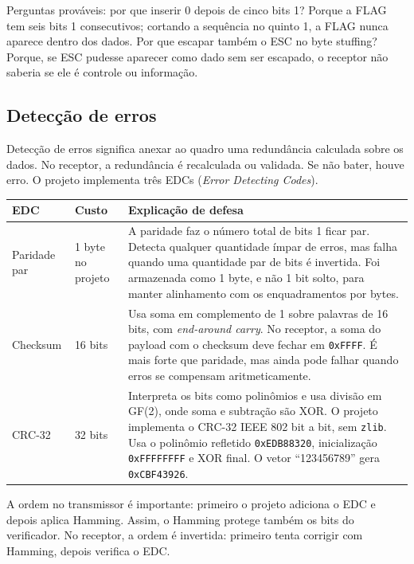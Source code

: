 \documentclass[10pt,a4paper]{article}
\newcommand{\codigo}[1]{\texttt{#1}}
\begin{document}
Perguntas prováveis: por que inserir 0 depois de cinco bits 1? Porque a FLAG tem seis bits 1 consecutivos; cortando a sequência no quinto 1, a FLAG nunca aparece dentro dos dados. Por que escapar também o ESC no byte stuffing? Porque, se ESC pudesse aparecer como dado sem ser escapado, o receptor não saberia se ele é controle ou informação.

\subsection{Detecção de erros}

Detecção de erros significa anexar ao quadro uma redundância calculada sobre os dados. No receptor, a redundância é recalculada ou validada. Se não bater, houve erro. O projeto implementa três EDCs (\textit{Error Detecting Codes}).

\begin{center}
\small
\begin{tabularx}{\linewidth}{p{2.2cm}p{1.8cm}Y}
\toprule
\textbf{EDC} & \textbf{Custo} & \textbf{Explicação de defesa} \\
\midrule
Paridade par & 1 byte no projeto & A paridade faz o número total de bits 1 ficar par. Detecta qualquer quantidade ímpar de erros, mas falha quando uma quantidade par de bits é invertida. Foi armazenada como 1 byte, e não 1 bit solto, para manter alinhamento com os enquadramentos por bytes. \\
Checksum & 16 bits & Usa soma em complemento de 1 sobre palavras de 16 bits, com \textit{end-around carry}. No receptor, a soma do payload com o checksum deve fechar em \codigo{0xFFFF}. É mais forte que paridade, mas ainda pode falhar quando erros se compensam aritmeticamente. \\
CRC-32 & 32 bits & Interpreta os bits como polinômios e usa divisão em GF(2), onde soma e subtração são XOR. O projeto implementa o CRC-32 IEEE 802 bit a bit, sem \codigo{zlib}. Usa o polinômio refletido \codigo{0xEDB88320}, inicialização \codigo{0xFFFFFFFF} e XOR final. O vetor ``123456789'' gera \codigo{0xCBF43926}. \\
\bottomrule
\end{tabularx}
\end{center}

A ordem no transmissor é importante: primeiro o projeto adiciona o EDC e depois aplica Hamming. Assim, o Hamming protege também os bits do verificador. No receptor, a ordem é invertida: primeiro tenta corrigir com Hamming, depois verifica o EDC.
\end{document}
